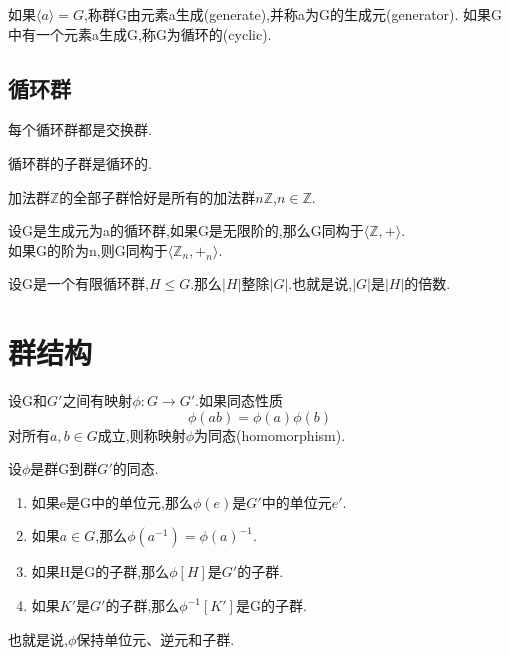 \documentclass[oneside,openany]{ctexbook}
\begin{document}
\begin{definition}{}{}
如果$\langle a\rangle=G$,称群G由元素a生成(generate),并称a为G的生成元(generator).
如果G中有一个元素a生成G,称G为循环的(cyclic).
\end{definition}

\section{循环群}

\begin{definition}{}{}
每个循环群都是交换群.
\end{definition}

\begin{definition}{}{}
循环群的子群是循环的.
\end{definition}

\begin{definition}{}{}
加法群$\mathbb{Z}$的全部子群恰好是所有的加法群$n\mathbb{Z}$,$n\in \mathbb{Z}$.
\end{definition}

\begin{definition}{}{}
设G是生成元为a的循环群,如果G是无限阶的,那么G同构于$\langle\mathbb{Z},+\rangle$.\\
如果G的阶为n,则G同构于$\langle\mathbb{Z}_n,+_n\rangle$.
\end{definition}

\begin{definition}{}{}
设G是一个有限循环群,$H\leq G$.那么$|H|$整除$|G|$.也就是说,$|G|$是$|H|$的倍数.
\end{definition}

\chapter{群结构}

\begin{definition}{}{}
设G和$G'$之间有映射$\phi :G\rightarrow G'$.如果同态性质$$\phi (ab)=\phi (a)\phi (b)$$
对所有$a,b\in G$成立,则称映射$\phi$为同态(homomorphism). 
\end{definition}

\begin{definition}{}{}
设$\phi$是群G到群$G'$的同态.
\begin{enumerate}
  \item 如果e是G中的单位元,那么$\phi (e)$是$G'$中的单位元$e'$.
  \item 如果$a\in G$,那么$\phi (a^{-1})=\phi(a)^{-1}$.
  \item 如果H是G的子群,那么$\phi [H]$是$G'$的子群.
  \item 如果$K'$是$G'$的子群,那么$\phi ^{-1}[K']$是G的子群.
\end{enumerate}
也就是说,$\phi$保持单位元、逆元和子群.
\end{definition}
\end{document}
